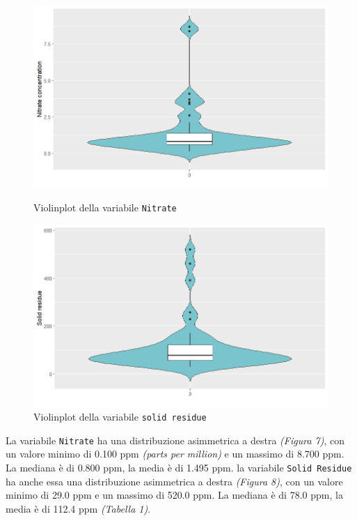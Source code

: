 \documentclass{article} %
\begin{document}
\begin{figure}[H]
    \centering
    \begin{minipage}{0.49\textwidth}
        \centering
        \includegraphics[width=\textwidth]{immagini/vp_nitrate.png}
        \captionsetup{justification=centering}
        \caption{Violinplot della variabile \texttt{Nitrate}}
    \end{minipage}
    \hfill
    \begin{minipage}{0.49\textwidth}
        \centering
        \includegraphics[width=\textwidth]{immagini/vp_sd.png}
        \captionsetup{justification=centering}
        \caption{Violinplot della variabile \texttt{solid residue}}
    \end{minipage}
\end{figure}
La variabile \texttt{Nitrate} ha una distribuzione asimmetrica a destra \textit{(Figura 7)}, con un valore minimo di 0.100 ppm \textit{(parts per million)} e un massimo di 8.700 ppm. La mediana è di 0.800 ppm, la media è di 1.495 ppm.
la variabile \texttt{Solid Residue} ha anche essa una distribuzione asimmetrica a destra \textit{(Figura 8)}, con un valore minimo di 29.0 ppm e un massimo di 520.0 ppm. La mediana è di 78.0 ppm, la media è di 112.4 ppm \textit{(Tabella 1)}.
\end{document}
